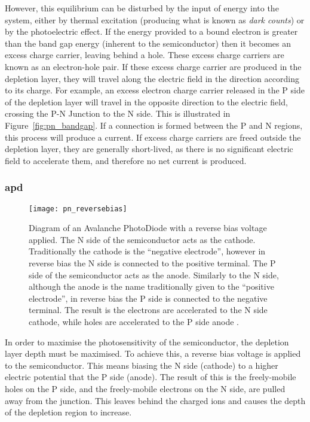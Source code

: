 However, this equilibrium can be disturbed by the input of energy into the system, either by thermal excitation (producing what is known as \textit{dark counts}) or by the photoelectric effect. If the energy provided to a bound electron is greater than the band gap energy (inherent to the semiconductor) then it becomes an excess charge carrier, leaving behind a hole. These excess charge carriers are known as an electron-hole pair. If these excess charge carrier are produced in the depletion layer, they will travel along the electric field in the direction according to its charge. For example, an excess electron charge carrier released in the P side of the depletion layer will travel in the opposite direction to the electric field, crossing the P-N Junction to the N side. This is illustrated in Figure~\ref{fig:pn_bandgap}. If a connection is formed between the P and N regions, this process will produce a current. If excess charge carriers are freed outside the depletion layer, they are generally short-lived, as there is no significant electric field to accelerate them, and therefore no net current is produced.

\subsubsection{\gls{apd}}

\begin{figure}
	\centering
    \texttt{[image: pn\_reversebias]} 
	\caption[Diagram of an Avalanche PhotoDiode.]{Diagram of an Avalanche PhotoDiode with a reverse bias voltage applied. The N side of the semiconductor acts as the cathode. Traditionally the cathode is the ``negative electrode'', however in reverse bias the N side is connected to the positive terminal. The P side of the semiconductor acts as the anode. Similarly to the N side, although the anode is the name traditionally given to the ``positive electrode'', in reverse bias the P side is connected to the negative terminal. The result is the electrons are accelerated to the N side cathode, while holes are accelerated to the P side anode \cite{Ghassemi2017}.}
	\label{fig:pn_reversebias}
\end{figure}

In order to maximise the photosensitivity of the semiconductor, the depletion layer depth must be maximised. To achieve this, a reverse bias voltage is applied to the semiconductor. This means biasing the N side (cathode) to a higher electric potential that the P side (anode). The result of this is the freely-mobile holes on the P side, and the freely-mobile electrons on the N side, are pulled away from the junction. This leaves behind the charged ions and causes the depth of the depletion region to increase.

